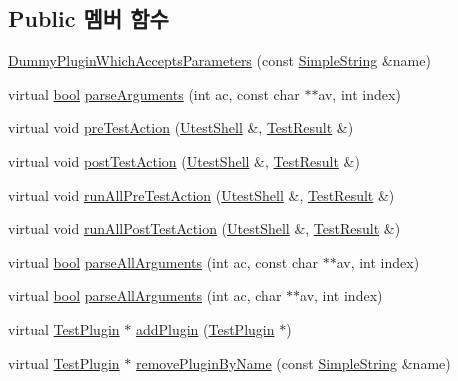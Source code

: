 \subsection*{Public 멤버 함수}
\begin{DoxyCompactItemize}
\item 
\hyperlink{class_dummy_plugin_which_accepts_parameters_a3b36b8e42b9ef6b0b8a89dc4b86e6444}{Dummy\+Plugin\+Which\+Accepts\+Parameters} (const \hyperlink{class_simple_string}{Simple\+String} \&name)
\item 
virtual \hyperlink{avb__gptp_8h_af6a258d8f3ee5206d682d799316314b1}{bool} \hyperlink{class_dummy_plugin_which_accepts_parameters_ab435f2817ffaaf4cd704c1b78100b6e0}{parse\+Arguments} (int ac, const char $\ast$$\ast$av, int index)
\item 
virtual void \hyperlink{class_dummy_plugin_aeb3d3b5a9cbcca6f8f4225bb29554ea2}{pre\+Test\+Action} (\hyperlink{class_utest_shell}{Utest\+Shell} \&, \hyperlink{class_test_result}{Test\+Result} \&)
\item 
virtual void \hyperlink{class_dummy_plugin_a4d9ea193c7b8e3eb8b50f985f688e4a8}{post\+Test\+Action} (\hyperlink{class_utest_shell}{Utest\+Shell} \&, \hyperlink{class_test_result}{Test\+Result} \&)
\item 
virtual void \hyperlink{class_test_plugin_aa3524b10b0f1613104fa75f1c1a72cf6}{run\+All\+Pre\+Test\+Action} (\hyperlink{class_utest_shell}{Utest\+Shell} \&, \hyperlink{class_test_result}{Test\+Result} \&)
\item 
virtual void \hyperlink{class_test_plugin_ac6e93f69beb5b43b8cedf17a77ccc6b1}{run\+All\+Post\+Test\+Action} (\hyperlink{class_utest_shell}{Utest\+Shell} \&, \hyperlink{class_test_result}{Test\+Result} \&)
\item 
virtual \hyperlink{avb__gptp_8h_af6a258d8f3ee5206d682d799316314b1}{bool} \hyperlink{class_test_plugin_acfa2bcea2c98a16cb7d2a8f177bb84b9}{parse\+All\+Arguments} (int ac, const char $\ast$$\ast$av, int index)
\item 
virtual \hyperlink{avb__gptp_8h_af6a258d8f3ee5206d682d799316314b1}{bool} \hyperlink{class_test_plugin_a6d3fb0408bb544bd7ec5ba9300328a5e}{parse\+All\+Arguments} (int ac, char $\ast$$\ast$av, int index)
\item 
virtual \hyperlink{class_test_plugin}{Test\+Plugin} $\ast$ \hyperlink{class_test_plugin_ac63612b566d31b52b9c09e0552f8fe9b}{add\+Plugin} (\hyperlink{class_test_plugin}{Test\+Plugin} $\ast$)
\item 
virtual \hyperlink{class_test_plugin}{Test\+Plugin} $\ast$ \hyperlink{class_test_plugin_a75abbb424eeb5b1466272ab22dd2cfcf}{remove\+Plugin\+By\+Name} (const \hyperlink{class_simple_string}{Simple\+String} \&name)
$$
\end{DoxyCompactItemize}
